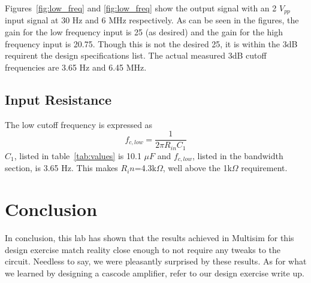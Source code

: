 \documentclass[12pt,letterpaper]{report}
\begin{document}
Figures~\ref{fig:low_freq} and \ref{fig:low_freq} show the output signal with an 2 $V_{pp}$ input signal at 30 Hz and 6 MHz respectively. As can be seen in the figures, the gain for the low frequency input is 25 (as desired) and the gain for the high frequency input is 20.75. Though this is not the desired 25, it is within the 3dB requirent the design specifications list. The actual measured 3dB cutoff frequencies are 3.65 Hz and 6.45 MHz. 

\subsection*{Input Resistance}

The low cutoff frequency is expressed as
$$
f_{c,low} = \frac{1}{2 \pi R_{in} C_1}
$$
$C_1$, listed in table~\ref{tab:values} is 10.1 $\mu F$ and $f_{c,low}$, listed in the bandwidth section, is 3.65 Hz. This makes $R_in$=4.3k$\Omega$, well above the 1k$\Omega$ requirement.

\section*{Conclusion}

In conclusion, this lab has shown that the results achieved in Multisim for this design exercise match reality close enough to not require any tweaks to the circuit. Needless to say, we were pleasantly surprised by these results. As for what we learned by designing a cascode amplifier, refer to our design exercise write up.
\end{document}
